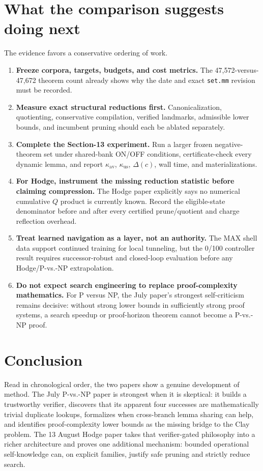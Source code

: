 \documentclass[11pt]{article}
\newcommand{\kuse}{\kappa_{\mathrm{us}}}
\newcommand{\kav}{\kappa_{\mathrm{av}}}
\begin{document}
\section{What the comparison suggests doing next}

The evidence favors a conservative ordering of work.

\begin{enumerate}
\item \textbf{Freeze corpora, targets, budgets, and cost metrics.}  The 47,572-versus-47,672 theorem count already shows why the date and exact \texttt{set.mm} revision must be recorded.
\item \textbf{Measure exact structural reductions first.}  Canonicalization, quotienting, conservative compilation, verified landmarks, admissible lower bounds, and incumbent pruning should each be ablated separately.
\item \textbf{Complete the Section-13 experiment.}  Run a larger frozen negative-theorem set under shared-bank ON/OFF conditions, certificate-check every dynamic lemma, and report \(\kav\), \(\kuse\), \(\Delta(c)\), wall time, and materializations.
\item \textbf{For Hodge, instrument the missing reduction statistic before claiming compression.}  The Hodge paper explicitly says no numerical cumulative \(Q\) product is currently known.  Record the eligible-state denominator before and after every certified prune/quotient and charge reflection overhead.
\item \textbf{Treat learned navigation as a layer, not an authority.}  The MAX shell data support continued training for local tunneling, but the 0/100 controller result requires successor-robust and closed-loop evaluation before any Hodge/P-vs.-NP extrapolation.
\item \textbf{Do not expect search engineering to replace proof-complexity mathematics.}  For P versus NP, the July paper's strongest self-criticism remains decisive: without strong lower bounds in sufficiently strong proof systems, a search speedup or proof-horizon theorem cannot become a P-vs.-NP proof.
\end{enumerate}

\section{Conclusion}

Read in chronological order, the two papers show a genuine development of method.  The July P-vs.-NP paper is strongest when it is skeptical: it builds a trustworthy verifier, discovers that its apparent four successes are mathematically trivial duplicate lookups, formalizes when cross-branch lemma sharing can help, and identifies proof-complexity lower bounds as the missing bridge to the Clay problem.  The 13 August Hodge paper takes that verifier-gated philosophy into a richer architecture and proves one additional mechanism: bounded operational self-knowledge can, on explicit families, justify safe pruning and strictly reduce search.
\end{document}
